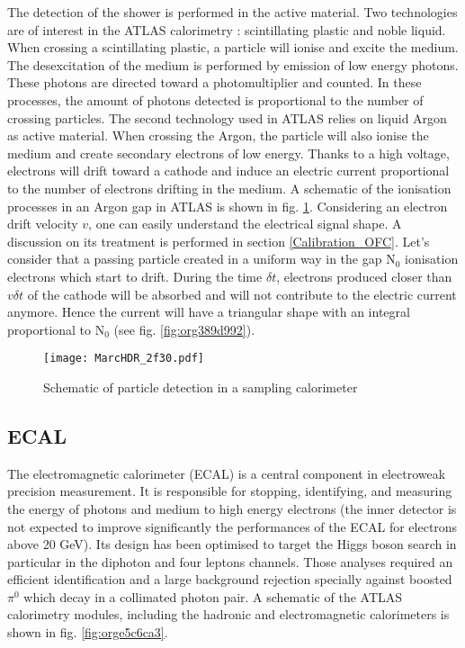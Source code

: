 The detection of the shower is performed in the active material.
Two technologies are of interest in the ATLAS calorimetry : scintillating plastic and noble liquid.
When crossing a scintillating plastic, a particle will ionise and excite the medium.
The desexcitation of the medium is performed by emission of low energy photons.
These photons are directed toward a photomultiplier and counted.
In these processes, the amount of photons detected is proportional to the number of crossing particles.
The second technology used in ATLAS relies on liquid Argon as active material.
When crossing the Argon, the particle will also ionise the medium and create secondary electrons of low energy.
Thanks to a high voltage, electrons will drift toward a cathode and induce an electric current proportional to the number of electrons drifting in the medium.
A schematic of the ionisation processes in an Argon gap in ATLAS is shown in fig. \ref{fig:org7afc547}.
Considering an electron drift velocity \(v\), one can easily understand the electrical signal shape.
A discussion on its treatment is performed in section \ref{Calibration_OFC}.
Let's consider that a passing particle created in a uniform way in the gap N\(_{\text{0}}\) ionisation electrons which start to drift.
During the time \(\delta t\), electrons produced closer than \(v\delta t\) of the cathode will be absorbed and will not contribute to the electric current anymore.
Hence the current will have a triangular shape with an integral proportional to N\(_{\text{0}}\) (see fig. \ref{fig:org389d992}).


\begin{figure}[htbp]
\centering
\texttt{[image: MarcHDR\_2f30.pdf]}
\caption{\label{fig:org7afc547}
Schematic of particle detection in a sampling calorimeter}
\end{figure}

\subsection{ECAL}
\label{sec:org1c46fb6}

The electromagnetic calorimeter (ECAL) is a central component in electroweak precision measurement.
It is responsible for stopping, identifying, and measuring the energy of photons and medium to high energy electrons (the inner detector is not expected to improve significantly the performances of the ECAL for electrons above 20 GeV).
Its design has been optimised to target the Higgs boson search in particular in the diphoton and four leptons channels.
Those analyses required an efficient identification and a large background rejection specially against boosted \(\pi^0\) which decay in a collimated photon pair.
A schematic of the ATLAS calorimetry modules, including the hadronic and electromagnetic calorimeters is shown in fig. \ref{fig:orge5c6ca3}.


